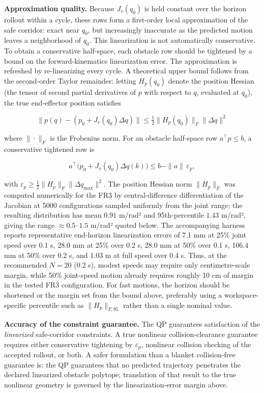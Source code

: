 \textbf{Approximation quality.} Because \(J_v(q_0)\) is held constant
over the horizon rollout within a cycle, these rows form a first-order
local approximation of the safe corridor: exact near \(q_0\), but
increasingly inaccurate as the predicted motion leaves a neighborhood of
\(q_0\). This linearization is not automatically conservative. To obtain
a conservative half-space, each obstacle row should be tightened by a
bound on the forward-kinematics linearization error. The approximation
is refreshed by re-linearizing every cycle. A theoretical upper bound
follows from the second-order Taylor remainder: letting \(H_p(q_0)\)
denote the position Hessian (the tensor of second partial derivatives of
\(p\) with respect to \(q\), evaluated at \(q_0\)), the true
end-effector position satisfies

\[\|p(q) - (p_0 + J_v(q_0)\Delta q)\| \leq \tfrac{1}{2} \|H_p(q_0)\|_F \|\Delta q\|^2\]

where \(\|\cdot\|_F\) is the Frobenius norm. For an obstacle half-space
row \(a^\top p\le b\), a conservative tightened row is

\[a^\top\bigl(p_0+J_v(q_0)\Delta q(k)\bigr)\le b-\|a\|\,\varepsilon_p,\]

with
\(\varepsilon_p \geq \tfrac{1}{2}\|H_p\|_{F}\|\Delta q_{\max}\|^2\). The
position Hessian norm \(\|H_p\|_F\) was computed numerically for the FR3
by central-difference differentiation of the Jacobian at 5000
configurations sampled uniformly from the joint range; the resulting
distribution has mean \(0.91\) m/rad² and 95th-percentile \(1.43\)
m/rad², giving the range \(\approx 0.5\)--\(1.5\) m/rad² quoted below.
The accompanying harness reports representative end-horizon
linearization errors of 7.1 mm at 25\% joint speed over 0.1 s, 28.0 mm
at 25\% over 0.2 s, 28.0 mm at 50\% over 0.1 s, 106.4 mm at 50\% over
0.2 s, and 1.03 m at full speed over 0.4 s. Thus, at the recommended
\(N=20\) (0.2 s), modest speeds may require only centimetre-scale
margin, while 50\% joint-speed motion already requires roughly 10 cm of
margin in the tested FR3 configuration. For fast motions, the horizon
should be shortened or the margin set from the bound above, preferably
using a workspace-specific percentile such as \(\|H_p\|_{F,95}\) rather
than a single nominal value.

\textbf{Accuracy of the constraint guarantee.} The QP guarantees
satisfaction of the \emph{linearized} safe-corridor constraints. A true
nonlinear collision-clearance guarantee requires either conservative
tightening by \(\varepsilon_p\), nonlinear collision checking of the
accepted rollout, or both. A safer formulation than a blanket
collision-free guarantee is: the QP guarantees that no predicted
trajectory penetrates the declared linearized obstacle polytope;
translation of that result to the true nonlinear geometry is governed by
the linearization-error margin above.

